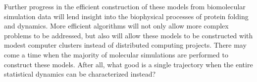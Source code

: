 Further progress in the efficient construction of these models from biomolecular simulation data will lend insight into the biophysical processes of protein folding and dynamics.
More efficient algorithms will not only allow more complex problems to be addressed, but also will allow these models to be constructed with modest computer clusters instead of distributed computing projects.
There may come a time when the majority of molecular simulations are performed to construct these models.
After all, what good is a single trajectory when the entire statistical dynamics can be characterized instead?

